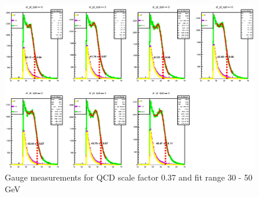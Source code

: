 \begin{figure}
\centering
\includegraphics[width=\textwidth]{data/img/gauge_037.eps}
\caption{Gauge measurements for QCD scale factor 0.37 and fit range 30 - 50 GeV}
\end{figure}

